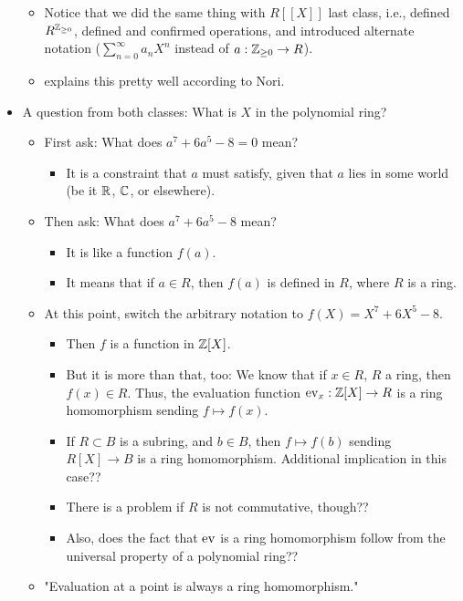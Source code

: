 \documentclass[../notes.tex]{subfiles}
\begin{document}
\begin{itemize}
\begin{itemize}
        \item Notice that we did the same thing with $R[[X]]$ last class, i.e., defined $R^{\mathbb{Z}_{\geq 0}}$, defined and confirmed operations, and introduced alternate notation ($\sum_{n=0}^\infty a_nX^n$ instead of $a:{\mathbb{Z}_{\geq 0}}\to R$).
        \item \textcite{bib:DummitFoote} explains this pretty well according to Nori.
    \end{itemize}
    \item A question from both classes: What is $X$ in the polynomial ring?
    \begin{itemize}
        \item First ask: What does $a^7+6a^5-8=0$ mean?
        \begin{itemize}
            \item It is a constraint that $a$ must satisfy, given that $a$ lies in some world (be it $\mathbb{R}$, $\mathbb{C}$, or elsewhere).
        \end{itemize}
        \item Then ask: What does $a^7+6a^5-8$ mean?
        \begin{itemize}
            \item It is like a function $f(a)$.
            \item It means that if $a\in R$, then $f(a)$ is defined in $R$, where $R$ is a ring.
        \end{itemize}
        \item At this point, switch the arbitrary notation to $f(X)=X^7+6X^5-8$.
        \begin{itemize}
            \item Then $f$ is a function in $\mathbb{Z}[X]$.
            \item But it is more than that, too: We know that if $x\in R$, $R$ a ring, then $f(x)\in R$. Thus, the evaluation function $\operatorname{ev}_x:\mathbb{Z}[X]\to R$ is a ring homomorphism sending $f\mapsto f(x)$.
            \item If $R\subset B$ is a subring, and $b\in B$, then $f\mapsto f(b)$ sending $R[X]\to B$ is a ring homomorphism. Additional implication in this case??
            \item There is a problem if $R$ is not commutative, though??
            \item Also, does the fact that $\operatorname{ev}$ is a ring homomorphism follow from the universal property of a polynomial ring??
        \end{itemize}
        \item "Evaluation at a point is always a ring homomorphism."

\end{itemize}
\end{itemize}
\end{document}
